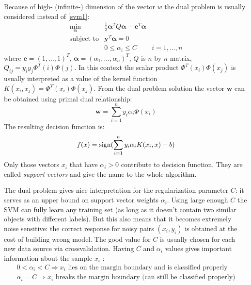 Because of high- (infinite-) dimension of the vector $w$ the dual problem is usually considered instead of \ref{svm1}:
\begin{equation}
\begin{array}{ccc}
\underset{\mathbf{\bm{\alpha}}}{\min} & \frac{1}{2} \bm{\alpha}^T Q \bm{\alpha} - \bm{e}^T \bm{\alpha} \\
\textrm{subject to} & \bm{y}^T \bm{\alpha} = 0 \\
& 0 \leq \alpha_i \leq C & i=1,\ldots,n
\end{array}
\label{svm2}
\end{equation}
where $\bm{e}=\left(1,\ldots,1\right)^T$, $\bm{\alpha} = \left( \alpha_1, \ldots, \alpha_n \right)^T$, $Q$ is $n$-by-$n$ matrix, $Q_{ij}= y_i y_j \Phi^T(i) \Phi(j)$. In this context the scalar product $\Phi^T(x_i) \Phi(x_j)$ is usually interpreted as a value of the kernel function $K(x_i, x_j) = \Phi^T(x_i) \Phi(x_j)$. From the dual problem solution the vector $\bm{w}$ can be obtained using primal dual relationship:
\begin{equation}
\bm{w}=\sum\limits_{i=1}^n y_i \alpha_i \Phi(x_i)
\end{equation}
The resulting decision function is:
\begin{equation}
f(x) = \operatorname{sign}( \sum\limits_{i=1}^n y_i \alpha_i K(x_i, x)+ b)
\end{equation}
Only those vectors $x_i$ that have $\alpha_i > 0$ contribute to decision function. They are called \textit{support vectors} and give the name to the whole algorithm.

The dual problem gives nice interpretation for the regularization parameter $C$: it serves as an upper bound on support vector weights $\alpha_i$. Using large enough $C$ the SVM can fully learn any training set (as long as it doesn't contain two similar objects with different labels). But this also means that it becomes extremely noise sensitive: the correct response for noisy pairs $(x_i, y_i)$ is obtained at the cost of building wrong model. The good value for $C$ is usually chosen for each new data source via crossvalidation. Having $C$ and $\alpha_i$ values gives important information about the sample $x_i$ \cite{burges1998tutorial}:
\begin{eqnarray}
0 < \alpha_i < C \Rightarrow \textrm{$x_i$ lies on the margin boundary and is classified properly} \\
\alpha_i = C \Rightarrow \textrm{$x_i$ breaks the margin boundary (can still be classified properly)}
\end{eqnarray}

